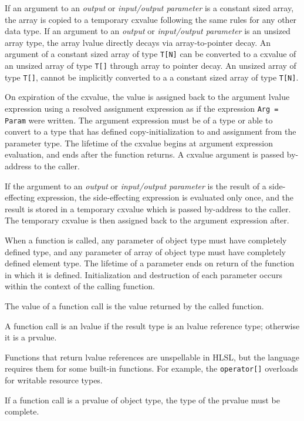 \p If an argument to an \textit{output} or \textit{input/output parameter} is a
constant sized array, the array is copied to a temporary cxvalue following the
same rules for any other data type. If an argument to an \textit{output} or
\textit{input/output parameter} is an unsized array type, the array lvalue
directly decays via array-to-pointer decay. An argument of a constant sized
array of type \texttt{T[N]} can be converted to a cxvalue of an unsized array
of type \texttt{T[]} through array to pointer decay. An unsized array of type
\texttt{T[]}, cannot be implicitly converted to a a constant sized array of type
\texttt{T[N]}.


\p On expiration of the cxvalue, the value is assigned back to the argument
lvalue expression using a resolved assignment expression as if the expression
\texttt{Arg = Param} were written. The argument expression must be of a type or
able to convert to a type that has defined copy-initialization to and assignment
from the parameter type. The lifetime of the cxvalue begins at argument
expression evaluation, and ends after the function returns. A cxvalue argument
is passed by-address to the caller.

\begin{note}
  If the argument to an \textit{output} or \textit{input/output parameter} is
  the result of a side-effecting expression, the side-effecting expression is
  evaluated only once, and the result is stored in a temporary cxvalue which is
  passed by-address to the caller. The temporary cxvalue is then assigned back
  to the argument expression after.
\end{note}

\p When a function is called, any parameter of object type must have completely
defined type, and any parameter of array of object type must have completely
defined element type. The lifetime of a parameter ends on return of the function
in which it is defined. Initialization and destruction of each
parameter occurs within the context of the calling function.

\p The value of a function call is the value returned by the called function.

\p A function call is an lvalue if the result type is an lvalue reference type;
otherwise it is a prvalue.

\begin{note}
  Functions that return lvalue references are unspellable in HLSL, but the
  language requires them for some built-in functions. For example, the
  \texttt{operator[]} overloads for writable resource types.
\end{note}

\p If a function call is a prvalue of object type, the type of the prvalue must
be complete.
